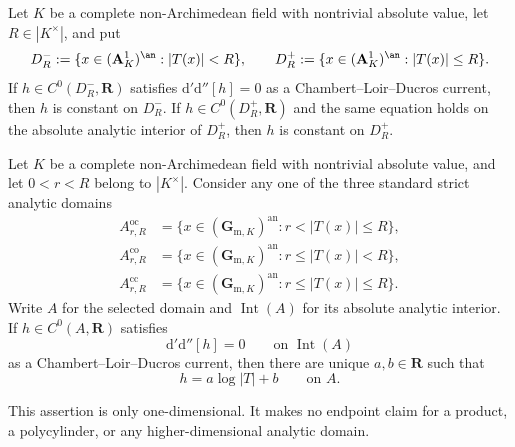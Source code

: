 \begin{proposition}\label{prop:p062-arbitrary-field-disc}
Let \(K\) be a complete non-Archimedean field with nontrivial absolute
value, let \(R\in |K^\times|\), and put
\[
 D_R^-:=\{x\in(\mathbf A_K^1)^{\an}:|T(x)|<R\},
 \qquad
 D_R^+:=\{x\in(\mathbf A_K^1)^{\an}:|T(x)|\leq R\}.
\]
If \(h\in C^0(D_R^-,\mathbf R)\) satisfies
\(
 \mathrm d'\mathrm d''[h]=0
\)
as a Chambert--Loir--Ducros current, then \(h\) is constant on \(D_R^-\).
If \(h\in C^0(D_R^+,\mathbf R)\) and the same equation holds on the
absolute analytic interior of \(D_R^+\), then \(h\) is constant on
\(D_R^+\).
\end{proposition}


\begin{proposition}\label{prop:p062-annulus-endpoint-arbitrary-field}
Let \(K\) be a complete non-Archimedean field with nontrivial absolute
value, and let
\(
             0<r<R
\)
belong to \(|K^\times|\).  Consider any one of the three standard strict
analytic domains
\[
 \begin{aligned}
 A_{r,R}^{\mathrm{oc}}
   &=\{x\in(\mathbf G_{\mathrm m,K})^{\mathrm{an}}:
                                      r<|T(x)|\leq R\},\\
 A_{r,R}^{\mathrm{co}}
   &=\{x\in(\mathbf G_{\mathrm m,K})^{\mathrm{an}}:
                                      r\leq|T(x)|<R\},\\
 A_{r,R}^{\mathrm{cc}}
   &=\{x\in(\mathbf G_{\mathrm m,K})^{\mathrm{an}}:
                                      r\leq|T(x)|\leq R\}.
 \end{aligned}
\]
Write \(A\) for the selected domain and
\(\operatorname{Int}(A)\) for its absolute analytic interior.  If
\(h\in C^0(A,\mathbf R)\) satisfies
\begin{equation}\label{eq:p062-annulus-endpoint-zero-current}
                 \mathrm d'\mathrm d''[h]=0
                 \qquad\text{on }\operatorname{Int}(A)
\end{equation}
as a Chambert--Loir--Ducros current, then there are unique
\(a,b\in\mathbf R\) such that
\begin{equation}\label{eq:p062-annulus-endpoint-affine}
                         h=a\log|T|+b
                         \qquad\text{on }A.
\end{equation}

This assertion is only one-dimensional.  It makes no endpoint claim for a
product, a polycylinder, or any higher-dimensional analytic domain.
\end{proposition}


